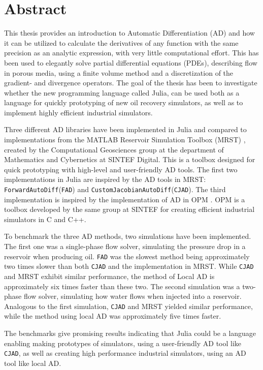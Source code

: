 \chapter*{Abstract}
This thesis provides an introduction to Automatic Differentiation (AD) and how it can be utilized to calculate the derivatives of any function with the same precision as an analytic expression, with very little computational effort. This has been used to elegantly solve partial differential equations (PDEs), describing flow in porous media, using a finite volume method and a discretization of the gradient- and divergence operators. The goal of the thesis has been to investigate whether the new programming language called Julia, can be used both as a language for quickly prototyping of new oil recovery simulators, as well as to implement highly efficient industrial simulators.

Three different AD libraries have been implemented in Julia and compared to implementations from the MATLAB Reservoir Simulation Toolbox (MRST) \emph{\citep{mrstHomepage}}, created by the Computational Geosciences  group  at  the  department  of  Mathematics  and  Cybernetics  at  SINTEF Digital. This is a toolbox designed for quick prototyping with high-level and user-friendly AD tools. The first two implementations in Julia are inspired by the AD tools in MRST: \texttt{ForwardAutoDiff}(\texttt{FAD}) and \texttt{CustomJacobianAutoDiff}(\texttt{CJAD}). The third implementation is inspired by the implementation of AD in OPM \emph{\citep{opm}}. OPM is a toolbox developed by the same group at SINTEF for creating efficient industrial simulators in C and C++. 

To benchmark the three AD methods, two simulations have been implemented. The first one was a single-phase flow solver, simulating the pressure drop in a reservoir when producing oil. \texttt{FAD} was the slowest method being approximately two times slower than both \texttt{CJAD} and the implementation in MRST. While \texttt{CJAD} and MRST exhibit similar performance, the method of Local AD is approximately six times faster than these two. The second simulation was a two-phase flow solver, simulating how water flows when injected into a reservoir. Analogous to the first simulation, \texttt{CJAD} and MRST yielded similar performance, while the method using local AD was approximately five times faster.

The benchmarks give promising results indicating that Julia could be a language enabling making prototypes of simulators, using a user-friendly AD tool like \texttt{CJAD}, as well as creating high performance industrial simulators, using an AD tool like local AD.